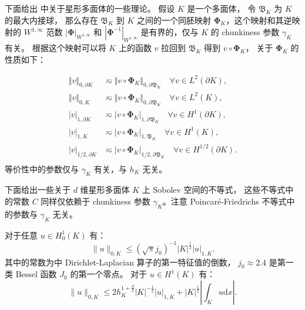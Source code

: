 下面给出 \cite{Grisvard1985} 中关于星形多面体的一些理论。
假设 $K$ 是一个多面体，
令 $\mathfrak{B}_K$ 为 $K$ 的最大内接球，
那么存在 $\mathfrak{B}_K$ 到 $K$ 之间的一个同胚映射
$\boldsymbol{\Phi}_K$，这个映射和其逆映射的 $W^{1, \infty}$ 范数
$|\boldsymbol{\Phi}|_{W^{1,\infty}}$ 和 $|\boldsymbol{\Phi}^{-1}|_{W^{1,
\infty}}$ 是有界的，仅与 $K$ 的 chunkiness 参数 $\gamma_K$ 有关。
根据这个映射可以将 $K$ 上的函数 $v$ 拉回到 $\mathfrak{B}_K$ 得到 $v\circ
\boldsymbol{\Phi}_K$，
关于 $\boldsymbol{\Phi}_K$ 的性质如下：
\begin{property}
$$
\begin{aligned}
    \Vert v \Vert_{0, \partial K} & \eqsim \Vert v\circ \boldsymbol{\Phi}_K
    \Vert_{0, \partial \mathfrak{B}_K} \quad \forall v \in L^2(\partial K),\\
    \Vert v \Vert_{0, K} & \eqsim \Vert v \circ \boldsymbol{\Phi}_K 
    \Vert_{0, \partial \mathfrak{B}_K} \quad \forall v \in L^2(K),\\
    |v|_{1, \partial K} & \eqsim |v\circ \boldsymbol{\Phi}_K|_{1, \partial \mathfrak{B}_K} \quad 
    \forall v \in H^1(\partial K), \\
    |v|_{1, K} & \eqsim |v\circ \boldsymbol{\Phi}_K|_{1, \mathfrak{B}_K} \quad 
    \forall v \in H^1(K), \\
    |v|_{1/2, \partial K} & \eqsim |v\circ \boldsymbol{\Phi}_K|_{1/2, \partial \mathfrak{B}_K} \quad 
    \forall v \in H^{1/2}(\partial K). \\
\end{aligned}
$$
等价性中的参数仅与 $\gamma_K$ 有关，与 $h_K$ 无关。
\end{property}
下面给出一些关于 $d$ 维星形多面体 $K$ 上 Sobolev 空间的不等式，
这些不等式中的常数 $C$ 同样仅依赖于 chunkiness 参数 $\gamma_K$。注意
Poincar\'e-Friedrichs 不等式中的参数与 $\gamma_K$ 无关。
\begin{lemma}
    对于任意 $u\in H^1_0(K)$ 有\cite{2003Henrot}：
    \begin{equation}
    \label{eq:Poincare-Friedrichs2}
    \|u\|_{0, K} \leq (\sqrt{\pi}j_0)^{-1}|K|^{\frac{1}{2}}|u|_{1, K}.
    \end{equation}
    其中的常数为中 Dirichlet-Laplacian 算子的第一特征值的倒数，
    $j_0\approx 2.4$ 是第一类 Bessel 函数 $J_0$ 的第一个零点。
    对于 $u\in H^1(K)$ 有\cite[定理 3.2]{2005ZhegQi}：
    \begin{equation}
        \label{eq:Poincare-Friedrichs1}
        \|u\|_{0, K} \leq 2h_K^{1+\frac{d}{2}}|K|^{-\frac{1}{2}}|u|_{1, K} + 
        |K|^{\frac{1}{2}}\left|\int_{K}u\mathrm{d}x\right|.
    \end{equation}
\end{lemma}
